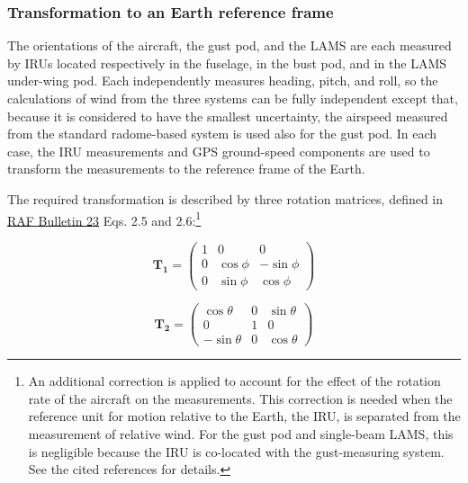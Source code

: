 \documentclass[12pt,twoside,english]{article}\usepackage[]{graphicx}\usepackage[]{color}
\let\OrgIndex\index
\renewcommand*{\index}[1]{\OrgIndex{#1}}
\begin{document}
\subsubsection{Transformation to an Earth reference frame\label{sub:EarthRef}}

The orientations of the aircraft, the gust pod, and the LAMS are each measured by IRUs located respectively in the fuselage, in the bust pod, and in the LAMS under-wing pod. Each independently measures heading, pitch, and roll, so the calculations of wind from the three systems can be fully independent except that, because it is considered to have the smallest uncertainty, the airspeed measured from the standard radome-based system is used also for the gust pod. In each case, the IRU measurements and GPS ground-speed components are used to transform the measurements to the reference frame of the Earth. 

The required transformation is described by three rotation matrices, defined in \href{https://www.eol.ucar.edu/raf/Bulletins/bulletin23.html}{RAF Bulletin 23} Eqs. 2.5 and 2.6:\footnote{An additional correction is applied to account for the effect of the rotation rate of the aircraft on the measurements. This correction is needed when the reference unit for motion relative to the Earth, the IRU, is separated from the measurement of relative wind. For the gust pod and single-beam LAMS, this is negligible because the IRU is co-located with the gust-measuring system. See the cited references for details.} 

\[
\mathbf{T_{1}}=\left(\begin{array}{ccc}
1 & 0 & 0\\ 0 & \cos\phi & -\sin\phi\\ 0 & \sin\phi & \cos\phi 
\end{array}\right) 
\]


\begin{equation}
\mathbf{T_{2}}=\left(\begin{array}{ccc}
\cos\theta & 0 & \sin\theta\\ 0 & 1 & 0\\ -\sin\theta & 0 & \cos\theta 
\end{array}\right)\label{eq:rotation-matrices}
\end{equation}
\end{document}

